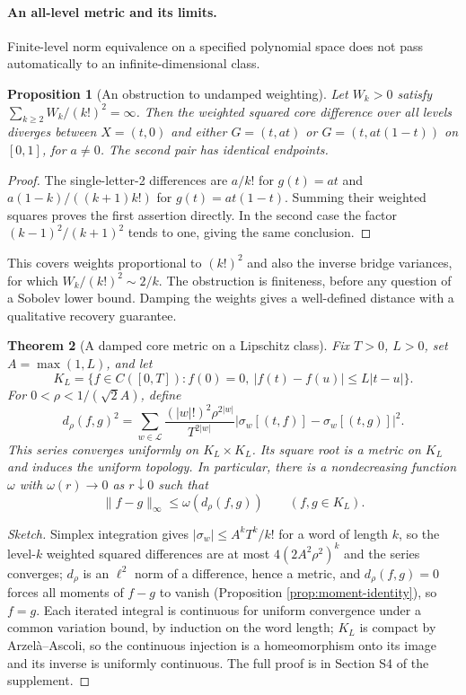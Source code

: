 \documentclass[11pt,english]{article}
\newtheorem{theorem}{Theorem}
\newtheorem{proposition}[theorem]{Proposition}
\theoremstyle{definition}
\theoremstyle{remark}
\begin{document}
\paragraph{An all-level metric and its limits.}
Finite-level norm equivalence on a specified polynomial space does
not pass automatically to an infinite-dimensional class.

\begin{proposition}[An obstruction to undamped weighting]
\label{prop:obstruction}
Let $W_k>0$ satisfy $\sum_{k\ge2}W_k/(k!)^2=\infty$.
Then the weighted squared core difference over all levels diverges
between $X=(t,0)$ and either $G=(t,at)$ or $G=(t,at(1-t))$ on
$[0,1]$, for $a\ne0$. The second pair has identical endpoints.
\end{proposition}

\begin{proof}
The single-letter-2 differences are $a/k!$ for $g(t)=at$ and
$a(1-k)/((k+1)k!)$ for $g(t)=at(1-t)$. Summing their weighted squares
proves the first assertion directly. In the second case the factor
$(k-1)^2/(k+1)^2$ tends to one, giving the same conclusion.
\end{proof}

This covers weights proportional to $(k!)^2$ and also the inverse
bridge variances, for which $W_k/(k!)^2\sim2/k$. The obstruction is
finiteness, before any question of a Sobolev lower bound. Damping
the weights gives a well-defined distance with a qualitative
recovery guarantee.

\begin{theorem}[A damped core metric on a Lipschitz class]
\label{thm:dampedmetric}
Fix $T>0$, $L>0$, set $A=\max(1,L)$, and let
\[
K_L=\{f\in C([0,T]):f(0)=0,\ |f(t)-f(u)|\le L|t-u|\}.
\]
For $0<\rho<1/(\sqrt2 A)$, define
\[
d_\rho(f,g)^2=
\sum_{w\in\mathcal L}
\frac{(|w|!)^2\rho^{2|w|}}{T^{2|w|}}
|\sigma_w[(t,f)]-\sigma_w[(t,g)]|^2.
\]
This series converges uniformly on $K_L\times K_L$. Its square
root is a metric on $K_L$ and induces the uniform topology.
In particular, there is a nondecreasing function $\omega$ with
$\omega(r)\to0$ as $r\downarrow0$ such that
\[
\|f-g\|_\infty\le\omega(d_\rho(f,g))\qquad(f,g\in K_L).
\]
\end{theorem}

\begin{proof}[Sketch]
Simplex integration gives $|\sigma_{w}|\le A^{k}T^{k}/k!$ for a word
of length $k$, so the level-$k$ weighted squared differences are at
most $4(2A^{2}\rho^{2})^{k}$ and the series converges; $d_{\rho}$ is
an $\ell^{2}$ norm of a difference, hence a metric, and
$d_{\rho}(f,g)=0$ forces all moments of $f-g$ to vanish (Proposition
\ref{prop:moment-identity}), so $f=g$. Each iterated integral is
continuous for uniform convergence under a common variation bound, by
induction on the word length; $K_{L}$ is compact by
Arzel\`a--Ascoli, so the continuous injection is a homeomorphism onto
its image and its inverse is uniformly continuous. The full proof is
in Section S4 of the supplement.
\end{proof}
\end{document}
